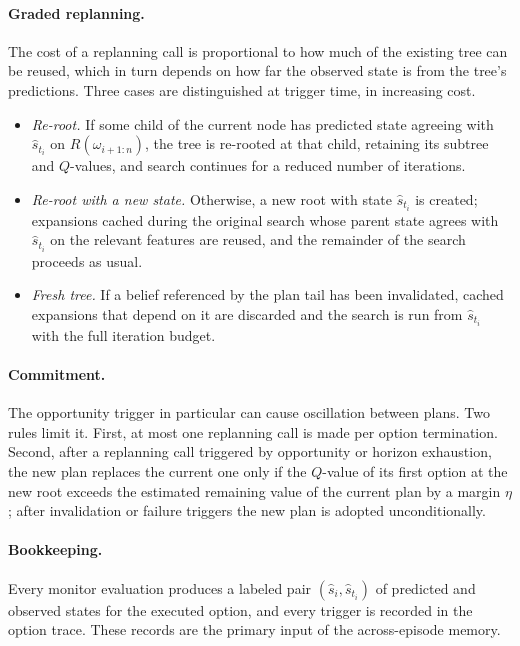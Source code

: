 \documentclass[11pt]{article}
\newcommand{\Rel}{R}
\newcommand{\shat}{\hat{s}}
\begin{document}
\paragraph{Graded replanning.}
The cost of a replanning call is proportional to how much of the existing tree can be reused, which in turn depends on how far the observed state is from the tree's predictions. Three cases are distinguished at trigger time, in increasing cost.
\begin{itemize}[leftmargin=1.5em,itemsep=1pt]
\item \emph{Re-root.} If some child of the current node has predicted state agreeing with $\shat_{t_i}$ on $\Rel(\omega_{i+1:n})$, the tree is re-rooted at that child, retaining its subtree and $Q$-values, and search continues for a reduced number of iterations.
\item \emph{Re-root with a new state.} Otherwise, a new root with state $\shat_{t_i}$ is created; expansions cached during the original search whose parent state agrees with $\shat_{t_i}$ on the relevant features are reused, and the remainder of the search proceeds as usual.
\item \emph{Fresh tree.} If a belief referenced by the plan tail has been invalidated, cached expansions that depend on it are discarded and the search is run from $\shat_{t_i}$ with the full iteration budget.
\end{itemize}

\paragraph{Commitment.}
The opportunity trigger in particular can cause oscillation between plans. Two rules limit it. First, at most one replanning call is made per option termination. Second, after a replanning call triggered by opportunity or horizon exhaustion, the new plan replaces the current one only if the $Q$-value of its first option at the new root exceeds the estimated remaining value of the current plan by a margin $\eta$; after invalidation or failure triggers the new plan is adopted unconditionally.

\paragraph{Bookkeeping.}
Every monitor evaluation produces a labeled pair $(\shat_i,\shat_{t_i})$ of predicted and observed states for the executed option, and every trigger is recorded in the option trace. These records are the primary input of the across-episode memory.
\end{document}
